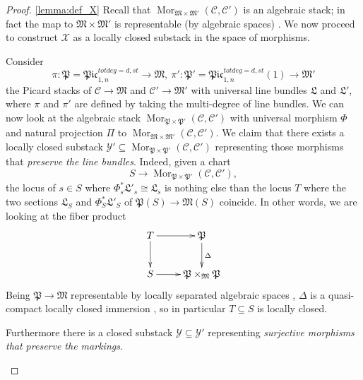 \documentclass[11pt]{amsart}
\renewcommand{\to}{\rightarrow}
\newcommand{\cC}{\mathcal C}
\theoremstyle{plain}
\theoremstyle{definition}
\begin{document}
\begin{proof}\ref{lemma:def_X}
Recall that $\operatorname{Mor}_{\mathfrak{M}\times\mathfrak{M}'}(\mathcal C,\mathcal C')$ is an algebraic stack; in fact the map to $\mathfrak{M}\times\mathfrak{M}'$ is representable (by algebraic spaces) \cite{OlssonHOM}. We now proceed to construct $\mathcal X$ as a locally closed substack in the space of morphisms.

\begin{description}[labelindent=0cm,leftmargin=\parindent]

\item[Step 1] Consider
 \[\pi\colon\mathfrak{P}=\mathfrak{Pic}^{tot deg=d,st}_{1,n}\to\mathfrak{M},\ \pi'\colon\mathfrak{P}'=\mathfrak{Pic}^{tot deg=d,st}_{1,n}(1)\to\mathfrak{M}'\]
  the Picard stacks of $\cC\to\mathfrak{M}$ and $\cC'\to\mathfrak{M'}$ with universal line bundles $\mathfrak{L}$ and $\mathfrak{L'}$, where $\pi$ and $\pi'$ are defined by taking the multi-degree of line bundles. We can now look at the algebraic stack $\operatorname{Mor}_{\mathfrak{P}\times\mathfrak{P}'}(\mathcal C,\mathcal C')$ with universal morphism
 $\Phi$ and natural projection $\Pi$ to $\operatorname{Mor}_{\mathfrak{M}\times\mathfrak{M}'}(\mathcal C,\mathcal C')$. We claim that there exists a locally closed substack $\mathcal{Y'}\subseteq \operatorname{Mor}_{\mathfrak{P}\times\mathfrak{P}'}(\mathcal C,\mathcal C')$ representing those morphisms that \emph{preserve the line bundles}. Indeed, given a chart 
 \begin{equation*}%
 S\to\operatorname{Mor}_{\mathfrak{P}\times\mathfrak{P}'}(\mathcal C,\mathcal C'),
  \end{equation*} 
   the locus of $s\in S$ where $\Phi_s^*\mathfrak{L}'_s\cong\mathfrak{L}_s$ is nothing else than the locus $T$ where the two sections $\mathfrak{L}_S$ and $\Phi_S^*\mathfrak{L}'_S$ of $\mathfrak{P}(S)\to\mathfrak{M}(S)$ coincide. In other words, we are looking at the fiber product 
  \[\xymatrix{T\ar[r]\ar[d]&\mathfrak{P}\ar[d]^{\Delta}\\
  S\ar[r]&\mathfrak{P}\times_{\mathfrak{M}}\mathfrak{P}}\]
Being $\mathfrak{P}\to\mathfrak{M}$ representable by locally separated algebraic spaces \cite[Theorem~8.3.1]{neron}, $\Delta$ is a quasi-compact locally closed immersion \cite[\href{http://stacks.math.columbia.edu/tag/04YU}{Tag 04YU}]{stacks-project}, so in particular $T\subseteq S$ is locally closed.

\item[Step 2] 
Furthermore there is a closed substack $\mathcal Y\subseteq \mathcal Y'$ representing \emph{surjective morphisms that preserve the markings}.


\end{description}
\end{proof}
\end{document}
